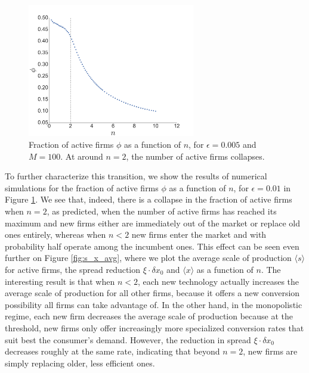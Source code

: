 \begin{figure}[!ht]
  \centering
  \includegraphics[width=0.65\textwidth]{figs_rle/s_pos.png}
  \caption{Fraction of active firms $\phi$ as a function of $n$, for $\epsilon = 0.005$ and $M=100$. At around $n=2$, the number of active firms collapses.}
  \label{fig:spos}
\end{figure}


To further characterize this transition, we show the results of numerical simulations for the fraction of active firms $\phi$ as a function of $n$, for $\epsilon = 0.01$ in Figure \ref{fig:spos}. We see that, indeed, there is a collapse in the fraction of active firms when $n = 2$, as predicted, when the number of active firms has reached its maximum and new firms either are immediately out of the market or replace old ones entirely, whereas when $n < 2$ new firms enter the market and with probability half operate among the incumbent ones. This effect can be seen even further on Figure \ref{fig:s_x_avg}, where we plot the average scale of production $\langle s \rangle$ for active firms, the spread reduction $\xi \cdot \delta x_0$ and $\langle x \rangle$ as a function of $n$. The interesting result is that when $n<2$, each new technology actually increases the average scale of production for all other firms, because it offers a new conversion possibility all firms can take advantage of. In the other hand, in the monopolistic regime, each new firm decreases the average scale of production because at the threshold, new firms only offer increasingly more specialized conversion rates that suit best the consumer's demand. However, the reduction in spread $\xi \cdot \delta x_0$ decreases roughly at the same rate, indicating that beyond $n=2$, new firms are simply replacing older, less efficient ones.

